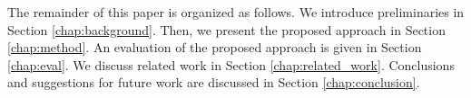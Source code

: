 
The remainder of this paper is organized as follows. We introduce preliminaries in Section \ref{chap:background}. Then, we present the proposed approach in Section \ref{chap:method}. An evaluation of the proposed approach is given in Section \ref{chap:eval}. We discuss related work in Section \ref{chap:related_work}. Conclusions and suggestions for future work are discussed in Section \ref{chap:conclusion}.

